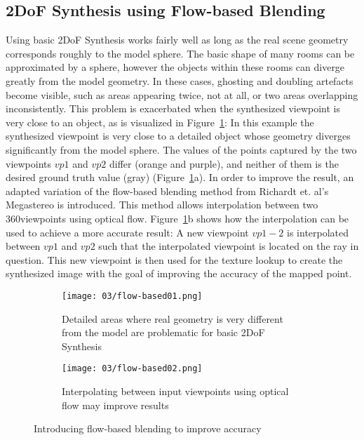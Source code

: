 \subsection{2DoF Synthesis using Flow-based Blending}
Using basic 2DoF Synthesis works fairly well as long as the real scene geometry corresponds roughly to the model sphere. The basic shape of many rooms can be approximated by a sphere, however the objects within these rooms can diverge greatly from the model geometry. In these cases, ghosting and doubling artefacts become visible, such as areas appearing twice, not at all, or two areas overlapping inconsistently. This problem is exacerbated when the synthesized viewpoint is very close to an object, as is visualized in Figure~\ref{fig:flow-based-mot}: In this example the synthesized viewpoint is very close to a detailed object whose geometry diverges significantly from the model sphere. The values of the points captured by the two viewpoints $vp1$ and $vp2$ differ (orange and purple), and neither of them is the desired ground truth value (gray) (Figure~\ref{fig:flow-based-mot}a). In order to improve the result, an adapted variation of the flow-based blending method from Richardt et. al's Megastereo \cite{megastereo} is introduced. This method allows interpolation between two 360\degree viewpoints using optical flow. Figure~\ref{fig:flow-based-mot}b shows how the interpolation can be used to achieve a more accurate result: A new viewpoint $vp1-2$ is interpolated between $vp1$ and $vp2$ such that the interpolated viewpoint is located on the ray in question. This new viewpoint is then used for the texture lookup to create the synthesized image with the goal of improving the accuracy of the mapped point.

\begin{figure}
\centering
    \hfill
    \begin{subfigure}[t]{0.4\textwidth}            
            \centering
            \texttt{[image: 03/flow-based01.png]}
            \caption{Detailed areas where real geometry is very different from the model are problematic for basic 2DoF Synthesis}
    \end{subfigure}%
    \hfill
    \begin{subfigure}[t]{0.4\textwidth}
            \centering
            \texttt{[image: 03/flow-based02.png]}
            \caption{Interpolating between input viewpoints using optical flow may improve results}
    \end{subfigure}
    \hfill
    \hfill
  \caption[Flow-based blending to improve accuracy in close, detailed areas]{Introducing flow-based blending to improve accuracy} \label{fig:flow-based-mot}
\end{figure}

